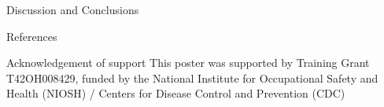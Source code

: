 \documentclass[final]{beamer}
\newlength{\sepwid}
\newlength{\onecolwid}
\begin{document}
\begin{frame}[t]
\begin{columns}[t,onlytextwidth,totalwidth=\onecolwid]
\begin{column}{\onecolwid}
\begin{block}{Discussion and Conclusions}
\end{block}

\vspace*{-0.5\baselineskip}


\begin{block}{References}
		\setlength{\bibitemsep}{0pt}
    \printbibliography
\end{block}

\vspace*{-0.5\baselineskip}


\begin{block}{Acknowledgement of support}
This poster was supported by Training Grant T42OH008429, funded by the National Institute for Occupational Safety and Health (NIOSH) / Centers for Disease Control and Prevention (CDC)
\end{block}

\vspace*{-1\baselineskip}

\end{column} %

\begin{column}{\sepwid}\end{column}%

\end{columns} %

\end{frame} %
\end{document}

